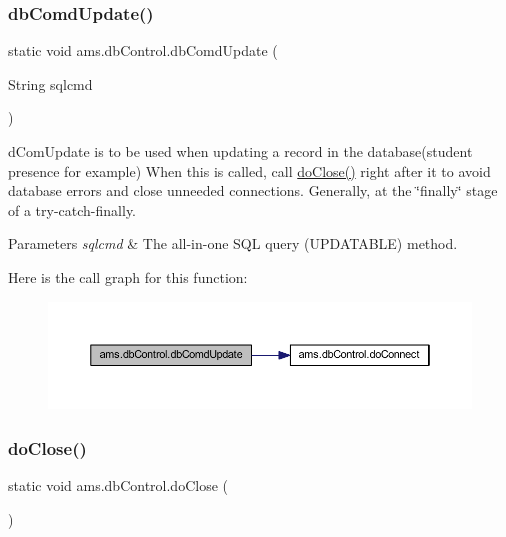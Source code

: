 \subsubsection{\texorpdfstring{dbComdUpdate()}{dbComdUpdate()}}
{\footnotesize\ttfamily static void ams.\+db\+Control.\+db\+Comd\+Update (\begin{DoxyParamCaption}\item[{String}]{sqlcmd }\end{DoxyParamCaption})\hspace{0.3cm}{\ttfamily [static]}}

d\+Com\+Update is to be used when updating a record in the database(student presence for example) When this is called, call \mbox{\hyperlink{classams_1_1db_control_ade1a4d8aaeedb1ae1f32a0e629aa09aa}{do\+Close()}} right after it to avoid database errors and close unneeded connections. Generally, at the \char`\"{}finally\char`\"{} stage of a try-\/catch-\/finally. 
\begin{DoxyParams}{Parameters}
{\em sqlcmd} & The all-\/in-\/one S\+QL query (U\+P\+D\+A\+T\+A\+B\+LE) method. \\
\hline
\end{DoxyParams}
Here is the call graph for this function\+:\nopagebreak
\begin{figure}[H]
\begin{center}
\leavevmode
\includegraphics[width=350pt]{classams_1_1db_control_a725cd6ae84ef6aca9bfd782b319d9f34_cgraph}
\end{center}
\end{figure}
\mbox{\label{classams_1_1db_control_ade1a4d8aaeedb1ae1f32a0e629aa09aa}} 
\subsubsection{\texorpdfstring{doClose()}{doClose()}}
{\footnotesize\ttfamily static void ams.\+db\+Control.\+do\+Close (\begin{DoxyParamCaption}{ }\end{DoxyParamCaption})\hspace{0.3cm}{\ttfamily [static]}}

